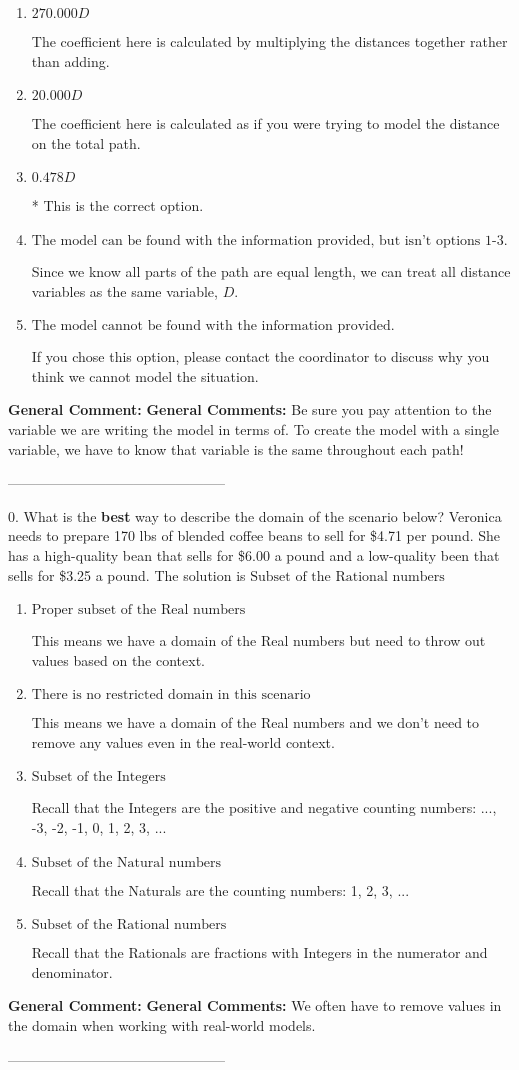 \documentclass{extbook}[14pt]
\begin{document}
\begin{enumerate}[label=\Alph*.] 
\item $ 270.000 D $ 

 The coefficient here is calculated by multiplying the distances together rather than adding. 
\item $ 20.000 D $ 

 The coefficient here is calculated as if you were trying to model the distance on the total path. 
\item $ 0.478 D $ 

 * This is the correct option. 
\item $ \text{The model can be found with the information provided, but isn't options 1-3.} $ 

 Since we know all parts of the path are equal length, we can treat all distance variables as the same variable, $D$. 
\item $ \text{The model cannot be found with the information provided.} $ 

 If you chose this option, please contact the coordinator to discuss why you think we cannot model the situation. 
\end{enumerate} 
 
\textbf{General Comment:} \textbf{General Comments:} Be sure you pay attention to the variable we are writing the model in terms of. To create the model with a single variable, we have to know that variable is the same throughout each path! 

-----------------------------------------------

0. What is the \textbf{best} way to describe the domain of the scenario below?
Veronica needs to prepare 170 lbs of blended coffee beans to sell for \$4.71 per pound. She has a high-quality bean that sells for \$6.00 a pound and a low-quality been that sells for \$3.25 a pound. 
The solution is $ \text{Subset of the Rational numbers} $ 

\begin{enumerate}[label=\Alph*.] 
\item $ \text{Proper subset of the Real numbers} $ 

 This means we have a domain of the Real numbers but need to throw out values based on the context. 
\item $ \text{There is no restricted domain in this scenario} $ 

 This means we have a domain of the Real numbers and we don't need to remove any values even in the real-world context. 
\item $ \text{Subset of the Integers} $ 

 Recall that the Integers are the positive and negative counting numbers: ..., -3, -2, -1, 0, 1, 2, 3, ...  
\item $ \text{Subset of the Natural numbers} $ 

 Recall that the Naturals are the counting numbers: 1, 2, 3, ... 
\item $ \text{Subset of the Rational numbers} $ 

 Recall that the Rationals are fractions with Integers in the numerator and denominator. 
\end{enumerate} 
 
\textbf{General Comment:} \textbf{General Comments:} We often have to remove values in the domain when working with real-world models. 

-----------------------------------------------
\end{document}
